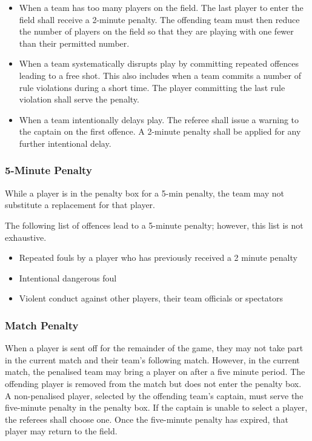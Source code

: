 \begin{itemize}
\item When a team has too many players on the field.
The last player to enter the field shall receive a 2-minute penalty.
The offending team must then reduce the number of players on the field so that they are playing with one fewer than their permitted number.
\item When a team systematically disrupts play by committing repeated offences leading to a free shot.
This also includes when a team commits a number of rule violations during a short time.
The player committing the last rule violation shall serve the penalty.
\item When a team intentionally delays play.
The referee shall issue a warning to the captain on the first offence.
A 2-minute penalty shall be applied for any further intentional delay.
\end{itemize}

\subsubsection{5-Minute Penalty}
While a player is in the penalty box for a 5-min penalty, the team may not substitute a replacement for that player.

The following list of offences lead to a 5-minute penalty; however, this list is not exhaustive.
\begin{itemize}
\item Repeated fouls by a player who has previously received a 2 minute penalty
\item Intentional dangerous foul
\item Violent conduct against other players, their team officials or spectators
\end{itemize}

\subsubsection{Match Penalty}
When a player is sent off for the remainder of the game, they may not take part in the current match and their team's following match.
However, in the current match, the penalised team may bring a player on after a five minute period.
The offending player is removed from the match but does not enter the penalty box.
A non-penalised player, selected by the offending team’s captain, must serve the five-minute penalty in the penalty box.
If the captain is unable to select a player, the referees shall choose one.
Once the five-minute penalty has expired, that player may return to the field.

